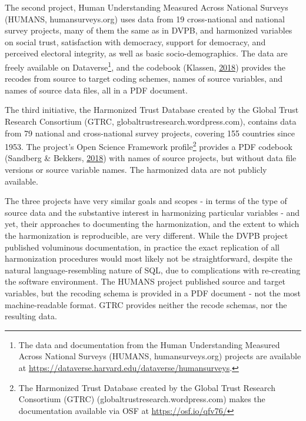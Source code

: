 \documentclass[12pt,]{article}
\let\rmarkdownfootnote\footnote%
\def\footnote{\protect\rmarkdownfootnote}
\begin{document}
The second project, Human Understanding Measured Across National Surveys (HUMANS, humansurveys.org) uses data from 19 cross-national and national survey projects, many of them the same as in DVPB, and harmonized variables on social trust, satisfaction with democracy, support for democracy, and perceived electoral integrity, as well as basic socio-demographics. The data are freely available on Dataverse\footnote{The data and documentation from the Human Understanding Measured Across National Surveys (HUMANS, humansurveys.org) projects are available at \url{https://dataverse.harvard.edu/dataverse/humansurveys}.}, and the codebook (Klassen, \protect\hyperlink{ref-Klassen2018}{2018}) provides the recodes from source to target coding schemes, names of source variables, and names of source data files, all in a PDF document.

The third initiative, the Harmonized Trust Database created by the Global Trust Research Consortium (GTRC, globaltrustresearch.wordpress.com), contains data from 79 national and cross-national survey projects, covering 155 countries since 1953. The project's Open Science Framework profile\footnote{The Harmonized Trust Database created by the Global Trust Research Consortium (GTRC) (globaltrustresearch.wordpress.com) makes the documentation available via OSF at \url{https://osf.io/qfv76/}} provides a PDF codebook (Sandberg \& Bekkers, \protect\hyperlink{ref-Sandberg2018}{2018}) with names of source projects, but without data file versions or source variable names. The harmonized data are not publicly available.

The three projects have very similar goals and scopes - in terms of the type of source data and the substantive interest in harmonizing particular variables - and yet, their approaches to documenting the harmonization, and the extent to which the harmonization is reproducible, are very different. While the DVPB project published voluminous documentation, in practice the exact replication of all harmonization procedures would most likely not be straightforward, despite the natural language-resembling nature of SQL, due to complications with re-creating the software environment. The HUMANS project published source and target variables, but the recoding schema is provided in a PDF document - not the most machine-readable format. GTRC provides neither the recode schemas, nor the resulting data.
\end{document}
